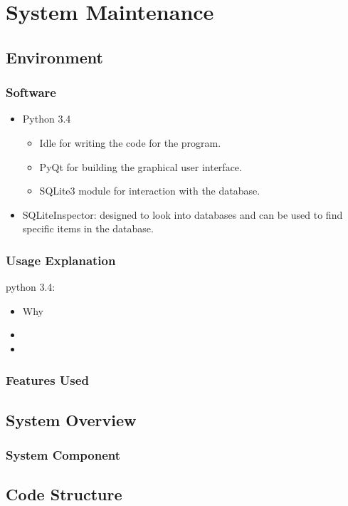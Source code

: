 \chapter{System Maintenance}


\section{Environment}

\subsection{Software}
\begin{itemize}
\item Python 3.4
\begin{itemize}
\item Idle for writing the code for the program.
\item PyQt for building the graphical user interface.
\item SQLite3 module for interaction with the database.
\end{itemize}
\item SQLiteInspector: designed to look into databases and can be used to find specific items in the database.
\end{itemize}
\subsection{Usage Explanation}
python 3.4:
\begin{itemize}
	\item Why
	\item 
	\item 
\end{itemize}
\subsection{Features Used}

\section{System Overview}

\subsection{System Component}

\section{Code Structure}

